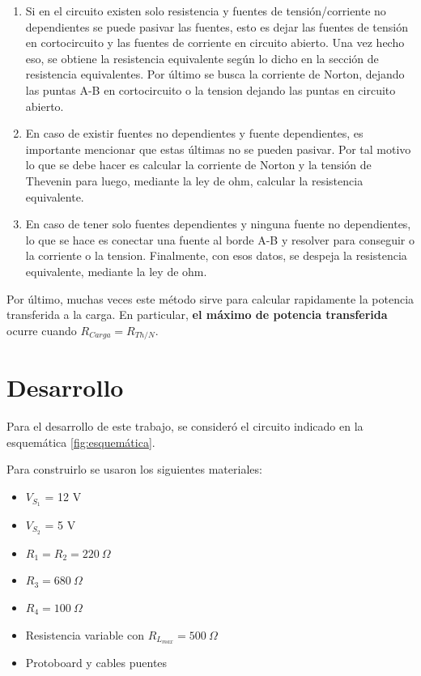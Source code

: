 \documentclass{article}
\begin{document}
        \begin{enumerate}
            \item Si en el circuito existen solo resistencia y fuentes de tensión/corriente no dependientes
                se puede pasivar las fuentes, esto es dejar las fuentes de tensión en cortocircuito y las fuentes de corriente en circuito abierto.
                Una vez hecho eso, se obtiene la resistencia equivalente según lo dicho en la sección de resistencia equivalentes.
                Por último se busca la corriente de Norton, dejando las puntas A-B en cortocircuito o la tension dejando las puntas en circuito abierto.
            \item En caso de existir fuentes no dependientes y fuente dependientes, es importante mencionar que estas últimas no se pueden pasivar. 
            Por tal motivo lo que se debe hacer es calcular la corriente de Norton y la tensión de Thevenin
                para luego, mediante la ley de ohm, calcular la resistencia equivalente.
            \item En caso de tener solo fuentes dependientes y ninguna fuente no dependientes, lo que se hace es conectar una fuente al borde A-B y resolver para conseguir o la corriente o la tension.
                Finalmente, con esos datos, se despeja la resistencia equivalente, mediante la ley de ohm.
        \end{enumerate}

        Por último, muchas veces este método sirve para calcular rapidamente la potencia transferida a la carga. En particular, \textbf{el máximo de potencia transferida} ocurre cuando $R_{\textit{Carga}} = R_{Th/N} $.



    \indent
    \section{Desarrollo}
        \quad Para el desarrollo de este trabajo, se consideró el circuito indicado en la esquemática \autoref{fig:esquemática}.\par
        Para construirlo se usaron los siguientes materiales:\par
        
            	\begin{itemize}
                \item $V_{S_{1}}$ = 12 V
                \item $V_{S_{2}}$ = 5 V
                \item $R_{1} = R_{2} = 220 ~\Omega $
                \item $R_{3} = 680~ \Omega $
                \item $R_{4} = 100~ \Omega $
                \item Resistencia variable con $R_{L_{max}} = 500~\Omega$
                \item Protoboard y cables puentes
                \end{itemize}
        
\end{document}
